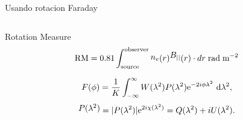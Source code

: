 \documentclass[xetex,aspectratio=169]{beamer}
\newcommand{\mypos}[2]{\tikz[remember picture]{\node[inner sep=0pt, anchor=base](#2){#1};}}
\begin{document}
	\begin{frame}{Usando rotacion Faraday}
		\begin{columns}
			
			\begin{column}{0.55\textwidth}
				
				
				
				\begin{block}{Rotation Measure}
					\begin{equation*}
						\mypos{\text{RM}}{rm} = 0.81 \int_{\text{source}}^{\text{observer}} \mypos{$n_e$}{ne}(r) \mypos{$B_{||}$}{be}(r) \cdot dr\; \text{rad}\;\text{m}^{-2}
					\end{equation*}
				\end{block}
				
				\begin{equation*}
					F(\phi) = \frac{1}{K} \int_{-\infty}^{\infty}{ W(\lambda^2)P(\lambda^2){\rm e}^{-2i\phi \lambda^2}~{\rm d}\lambda^2 },
				\end{equation*}
				\begin{equation*}
					\mypos{$P(\lambda^2)$}{ppos} = |P(\lambda^2)|{\rm e}^{2i\chi(\lambda^2)} = Q(\lambda^2) + iU(\lambda^2).
				\end{equation*}
			\end{column}
			

\end{columns}
\end{frame}
\end{document}
